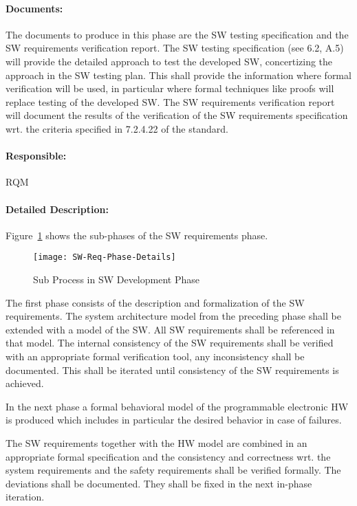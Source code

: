 \paragraph{Documents:}
\label{sec:sw-req-documents}
The documents to produce in this phase are the SW testing
specification and the SW requirements verification report. The SW testing
specification (see 6.2, A.5) will provide the detailed approach to test the
developed SW, concertizing the approach in the SW testing plan. This shall
provide the information where formal verification will be used, in particular
where formal techniques like proofs will replace testing of the developed SW.
The SW requirements verification report will document the results of the
verification of the SW requirements specification wrt. the criteria specified in
7.2.4.22 of the standard.

\paragraph{Responsible:}
\label{sec:sw-req-responsible}
RQM

\paragraph{Detailed Description:}
\label{sec:sw-req-deta-descr}
Figure~\ref{fig:detailed-sw-dev-phase} shows the sub-phases of the SW
requirements phase.

\begin{figure}[ht]
  \centering
  \texttt{[image: SW-Req-Phase-Details]}
  \caption{Sub Process in SW Development Phase}
  \label{fig:detailed-sw-dev-phase}
\end{figure}

The first phase consists of the description and formalization of the SW
requirements. The system architecture model from the preceding phase shall be
extended with a model of the SW. All SW requirements shall be referenced in that
model. The internal consistency of the SW requirements shall be verified with an
appropriate formal verification tool, any inconsistency shall be
documented. This shall be iterated until consistency of the SW requirements is
achieved.

In the next phase a formal behavioral model of the programmable electronic HW is
produced which includes in particular the desired behavior in case of
failures.

The SW requirements together with the HW model are combined in an appropriate
formal specification  and the consistency and correctness wrt. the system
requirements and the safety requirements shall be verified formally. The
deviations shall be documented. They shall be fixed in the next in-phase
iteration.



